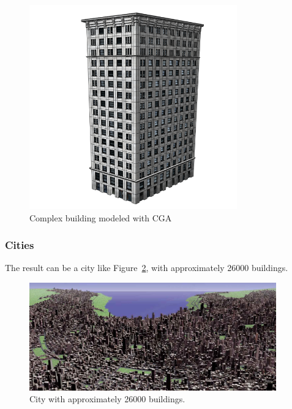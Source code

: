 \begin{figure}[htbp]
  \centering
  \includegraphics[width=0.8\textwidth]{img/Procedural-Modeling-of-Cities/building2.png}
  \caption{Complex building modeled with CGA}
  \label{fig:CEnewbuilding}
\end{figure}


\subsubsection{Cities} %
\label{ssub:Cities1}

The result can be a city like Figure~\ref{fig:bigCity}, with approximately 26000 buildings.

\begin{figure}[htbp]
  \centering
  \includegraphics[width=0.95\textwidth]{img/Procedural-Modeling-of-Cities/City.png}
  \caption{City with approximately 26000 buildings.}
  \label{fig:bigCity}
\end{figure}

